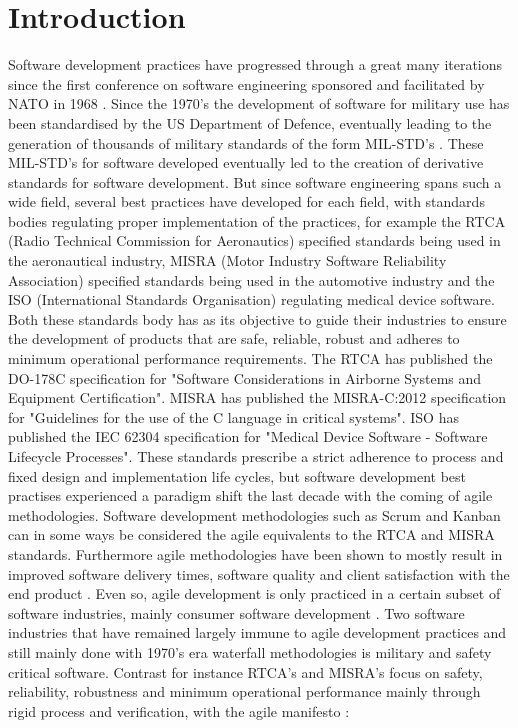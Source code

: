 \documentclass{sig-alternate-05-2015}
\begin{document}
\section{Introduction}
Software development practices have progressed through a great many iterations since the first conference on software engineering sponsored and facilitated by NATO in 1968 \cite{Bauer_1968}. Since the 1970's the development of software for military use has been standardised by the US Department of Defence, eventually leading to the generation of thousands of military standards of the form MIL-STD's \cite{McDonald_2010}. These MIL-STD's for software developed eventually led to the creation of derivative standards for software development. 
\break
\break
But since software engineering spans such a wide field, several best practices have developed for each field, with standards bodies regulating proper implementation of the practices, for example the RTCA (Radio Technical Commission for Aeronautics) specified standards being used in the aeronautical industry, MISRA (Motor Industry Software Reliability Association) specified standards being used in the automotive industry and the ISO (International Standards Organisation) regulating medical device software.  Both these standards body has as its objective to guide their industries to ensure the development of products that are safe, reliable, robust and adheres to minimum operational performance requirements.
\break
\break
The RTCA has published the DO-178C \cite{RTCA_2012} specification for "Software Considerations in Airborne Systems and Equipment Certification". MISRA has published the MISRA-C:2012 \cite{MISRA_2012} specification for "Guidelines for the use of the C language in critical systems". ISO has published the IEC 62304 \cite{Jordan_2006} specification for "Medical Device Software - Software Lifecycle Processes".
\break
\break
These standards prescribe a strict adherence to process and fixed design and implementation life cycles, but software development best practises experienced a paradigm shift the last decade with the coming of agile methodologies. Software development methodologies such as Scrum and Kanban can in some ways be considered the agile equivalents to the RTCA and MISRA standards. Furthermore agile methodologies have been shown to mostly result in improved software delivery times, software quality and client satisfaction with the end product \cite{Armbrust_2011}.
\break
\break
Even so, agile development is only practiced in a certain subset of software industries, mainly consumer software development \cite{Diebold_2014}. Two software industries that have remained largely immune to agile development practices and still mainly done with 1970's era waterfall methodologies is military and safety critical software. Contrast for instance RTCA's and MISRA's focus on safety, reliability, robustness and minimum operational performance mainly through rigid process and verification, with the agile manifesto \cite{Beck_2001}:
\end{document}
